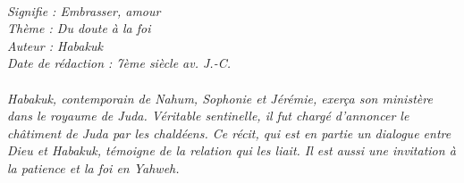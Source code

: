 \BFont
\noindent\hrulefill
{\footnotesize
\textit{
\bigskip
{\centering{}
\\Signifie : Embrasser, amour
\\Thème : Du doute à la foi
\\Auteur : Habakuk
\\Date de rédaction : 7ème siècle av. J.-C.\\}
}
\textit{
\\Habakuk, contemporain de Nahum, Sophonie et Jérémie, exerça son ministère dans le royaume de Juda. Véritable sentinelle, il fut chargé d’annoncer le châtiment de Juda par les chaldéens. Ce récit, qui est en partie un dialogue entre Dieu et Habakuk, témoigne de la relation qui les liait. Il est aussi une invitation à la patience et la foi en Yahweh.\bigskip
}
}
\par\nobreak\noindent\hrulefill
